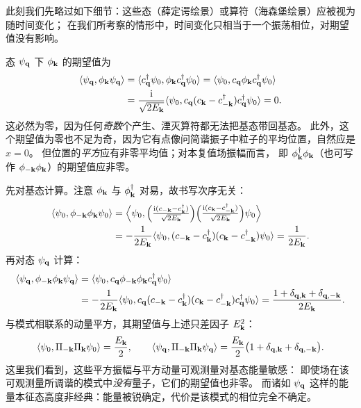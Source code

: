 此刻我们先略过如下细节：这些态（薛定谔绘景）或算符（海森堡绘景）应被视为随时间变化；
在我们所考察的情形中，时间变化只相当于一个振荡相位，对期望值没有影响。

态 $\psi_{\mathbf{q}}$ 下 $\phi_{\mathbf{k}}$ 的期望值为
\begin{align*}
\langle\psi_{\mathbf{q}},\phi_{\mathbf{k}}\psi_{\mathbf{q}}\rangle
&=\langle c^{\dagger}_{\mathbf{q}}\psi_{0},\phi_{\mathbf{k}}c^{\dagger}_{\mathbf{q}}\psi_{0}\rangle
=\langle\psi_{0},c_{\mathbf{q}}\phi_{\mathbf{k}}c^{\dagger}_{\mathbf{q}}\psi_{0}\rangle\\
&=\frac{\mathrm{i}}{\sqrt{2E_{\mathbf{k}}}}\langle\psi_{0},c_{\mathbf{q}}(c_{\mathbf{k}}-c^{\dagger}_{-\mathbf{k}})c^{\dagger}_{\mathbf{q}}\psi_{0}\rangle=0 .
\end{align*}
这必然为零，因为任何\emph{奇数}个产生、湮灭算符都无法把基态带回基态。
此外，这个期望值为零也不足为奇，因为它有点像问简谐振子中粒子的平均位置，自然应是 $x=0$。
但位置的\emph{平方}应有非零平均值；对本复值场振幅而言，
即 $\phi^{\dagger}_{\mathbf{k}}\phi_{\mathbf{k}}$（也可写作 $\phi_{-\mathbf{k}}\phi_{\mathbf{k}}$）的期望值应非零。

先对基态计算。注意 $\phi_{\mathbf{k}}$ 与 $\phi^{\dagger}_{\mathbf{k}}$ 对易，故书写次序无关：
\begin{align*}
\langle\psi_{0},\phi_{-\mathbf{k}}\phi_{\mathbf{k}}\psi_{0}\rangle
&=\Bigl\langle\psi_{0},
\Bigl(\tfrac{\mathrm{i}(c_{-\mathbf{k}}-c^{\dagger}_{\mathbf{k}})}{\sqrt{2E_{\mathbf{k}}}}\Bigr)
\Bigl(\tfrac{\mathrm{i}(c_{\mathbf{k}}-c^{\dagger}_{-\mathbf{k}})}{\sqrt{2E_{\mathbf{k}}}}\Bigr)\psi_{0}\Bigr\rangle\\
&=-\frac{1}{2E_{\mathbf{k}}}\langle\psi_{0},(c_{-\mathbf{k}}-c^{\dagger}_{\mathbf{k}})(c_{\mathbf{k}}-c^{\dagger}_{-\mathbf{k}})\psi_{0}\rangle
=\frac{1}{2E_{\mathbf{k}}} .
\end{align*}
再对态 $\psi_{\mathbf{q}}$ 计算：
\begin{align*}
\langle\psi_{\mathbf{q}},\phi_{-\mathbf{k}}\phi_{\mathbf{k}}\psi_{\mathbf{q}}\rangle
&=\langle\psi_{0},c_{\mathbf{q}}\phi_{-\mathbf{k}}\phi_{\mathbf{k}}c^{\dagger}_{\mathbf{q}}\psi_{0}\rangle\\
&=-\frac{1}{2E_{\mathbf{k}}}\langle\psi_{0},
c_{\mathbf{q}}(c_{-\mathbf{k}}-c^{\dagger}_{\mathbf{k}})(c_{\mathbf{k}}-c^{\dagger}_{-\mathbf{k}})c^{\dagger}_{\mathbf{q}}\psi_{0}\rangle
=\frac{1+\delta_{\mathbf{q},\mathbf{k}}+\delta_{\mathbf{q},-\mathbf{k}}}{2E_{\mathbf{k}}} .
\end{align*}
与模式相联系的动量平方，其期望值与上述只差因子 $E_{\mathbf{k}}^{2}$：
\begin{equation*}
\langle\psi_{0},\Pi_{-\mathbf{k}}\Pi_{\mathbf{k}}\psi_{0}\rangle=\frac{E_{\mathbf{k}}}{2},\qquad
\langle\psi_{\mathbf{q}},\Pi_{-\mathbf{k}}\Pi_{\mathbf{k}}\psi_{\mathbf{q}}\rangle
=\frac{E_{\mathbf{k}}}{2}\bigl(1+\delta_{\mathbf{q},\mathbf{k}}+\delta_{\mathbf{q},-\mathbf{k}}\bigr).
\end{equation*}
这里我们看到，这些平方振幅与平方动量可观测量对基态能量敏感：
即使场在该可观测量所调谐的模式中\emph{没有}量子，它们的期望值也非零。
而诸如 $\psi_{\mathbf{q}}$ 这样的能量本征态高度非经典：能量被锐确定，代价是该模式的相位完全不确定。

